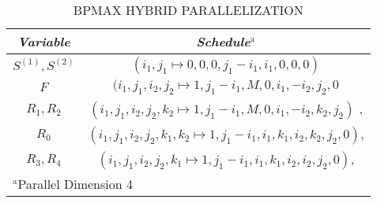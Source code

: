 \begin{table}[htbp]
\caption{\uppercase{BPMax hybrid Parallelization}}
\begin{center}
\begin{tabular}{|c|c|}
\hline
\textbf{\textit{Variable}}& \textbf{\textit{Schedule}}$^{\mathrm{a}}$ \\
\hline
 $S^{(1)}, S^{(2)}$ & $(i_{1},j_{1} \mapsto 0, 0, 0, j_{1}-i_{1}, i_{1}, 0, 0, 0)$   \\
\cline{1-2} 
 $F$ & $(i_{1},j_{1},i_{2},j_{2} \mapsto 1, j_{1}-i_{1}, M, 0, i_{1}, -i_{2}, j_{2}, 0$   \\
\cline{1-2} 
$R_{1}, R_{2}$ & $(i_{1},j_{1},i_{2},j_{2},k_{2} \mapsto 1, j_{1}-i_{1}, M, 0, i_{1}, -i_{2}, k_{2}, j_{2})$ ,   \\
 \cline{1-2} 
$R_{0}$ & $(i_{1},j_{1},i_{2},j_{2},k_{1},k_{2} \mapsto 1, j_{1}-i_{1}, i_{1}, k_{1}, i_{2}, k_{2}, j_{2}, 0)$,    \\
\cline{1-2} 
$R_{3}, R_{4}$ & $(i_{1},j_{1},i_{2},j_{2},k_{1} \mapsto 1, j_{1}-i_{1}, i_{1}, k_{1}, i_{2}, i_{2}, j_{2},0)$,    \\
\cline{1-2} 
\hline
\multicolumn{2}{l}{$^{\mathrm{a}}$Parallel Dimension 4}
\end{tabular}
\label{tab:hybrid_schedule}
\end{center}
\end{table}